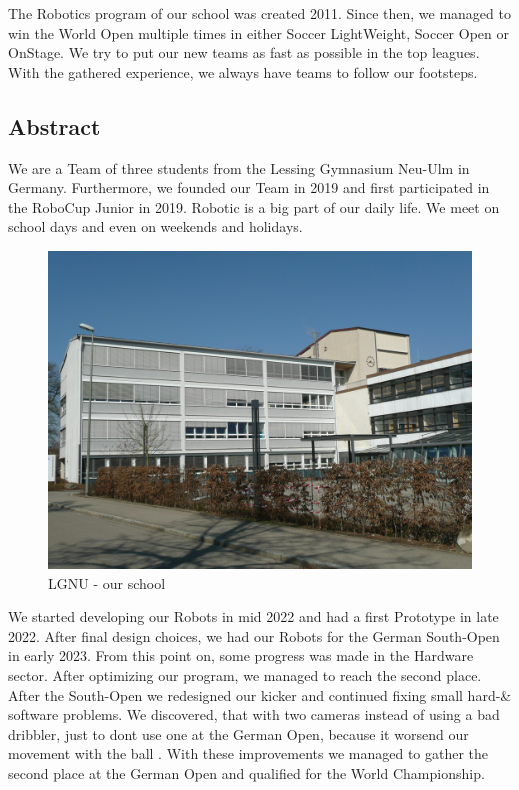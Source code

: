 \documentclass{scrartcl}
\begin{document}
The Robotics program of our school was created 2011. Since then, we managed to win the World Open
multiple times in either Soccer LightWeight, Soccer Open or OnStage.
We try to put our new teams as fast as possible in the top leagues. With the gathered experience, we always
have teams to follow our footsteps.
\newline
\subsection{Abstract}
We are a Team of three students from the Lessing Gymnasium Neu-Ulm in Germany. Furthermore, we founded our Team
in 2019 and first participated in the RoboCup Junior in 2019. Robotic is a big part of our daily life.
We meet on school days and even on weekends and holidays.

\begin{figure}[h]
    \centering
    \includegraphics[width=\textwidth]{img/lgnu.png}
    \caption{LGNU - our school}
    \label{fig:lgnu}
\end{figure}
\newline
\newline
We started developing our Robots in mid 2022 and had a first Prototype in late 2022. After final design
choices, we had our Robots for the German South-Open in early 2023. From this point on, some progress was
made in the Hardware sector.
After optimizing our program, we managed to reach the second place.
\newline
After the South-Open we redesigned our kicker and continued fixing small hard-\& software problems. We discovered, that with two cameras
instead of using a bad dribbler, just to dont use one at the German Open, because it worsend our movement with the ball .
With these improvements we managed to gather the second place at the German Open and qualified for the World Championship.
\end{document}
